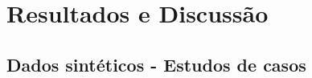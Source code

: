 \documentclass[a4paper, 12 pt]{article} %
\begin{document}

\clearpage


\section{Resultados e Discussão}
\label{ResultadosDiscussao}

\subsection{Dados sintéticos - Estudos de casos}

\blindtext 
%
\blindtext 
%
\blindtext
\end{document}
